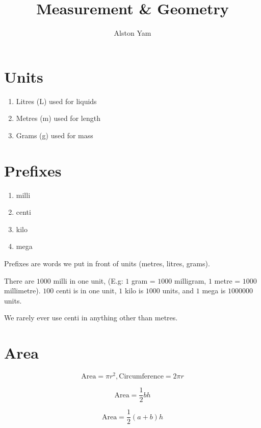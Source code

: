 \documentclass{article}
\title{Measurement \& Geometry}
\author{Alston Yam}
\date{}
\theoremstyle{mytheoremstyle}
\theoremstyle{mytheoremstyle}
\theoremstyle{myproblemstyle}
\begin{document}
    \maketitle

    \section{Units}
    \begin{enumerate}
        \item Litres (L) used for liquids
        \item Metres (m) used for length
        \item Grams (g) used for mass
    \end{enumerate}

    \section{Prefixes}

    \begin{enumerate}
        \item milli
        \item centi
        \item kilo
        \item mega
    \end{enumerate}

    Prefixes are words we put in front of units (metres, litres, grams). 

    There are $1000$ milli in one unit, (E.g: $1$ gram = $1000$ milligram, $1$ metre = $1000$ millimetre).
    $100$ centi is in one unit, $1$ kilo is $1000$ units, and $1$ mega is $1000000$ units.

    We rarely ever use centi in anything other than metres.

    \section{Area}
    \begin{theorem}[Circle]
        \[\text{Area} = \pi r^2, \text{Circumference} = 2\pi r\]
    \end{theorem}

    \begin{theorem}[Triangle]
        \[\text{Area} = \frac{1}{2}bh\]
    \end{theorem}

    \begin{theorem}[Trapezium]
        \[\text{Area} = \frac{1}{2}(a+b)h\]
    \end{theorem}
    
\end{document}
